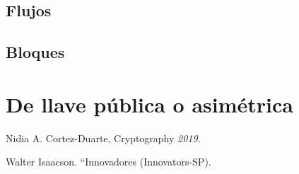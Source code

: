 \documentclass[12pt, fleqn]{report}                             %
\theoremstyle{break}                                            %
\begin{document}
        \clearpage
        \section{Flujos}

        \clearpage
        \section{Bloques}

        
    \chapter{De llave pública o asimétrica}





                
\begin{thebibliography}{10}

    Nidia A. Cortez-Duarte, Cryptography
      \textit{2019}. 

    Walter Isaacson. “Innovadores (Innovators-SP).

\end{thebibliography}
\end{document}

